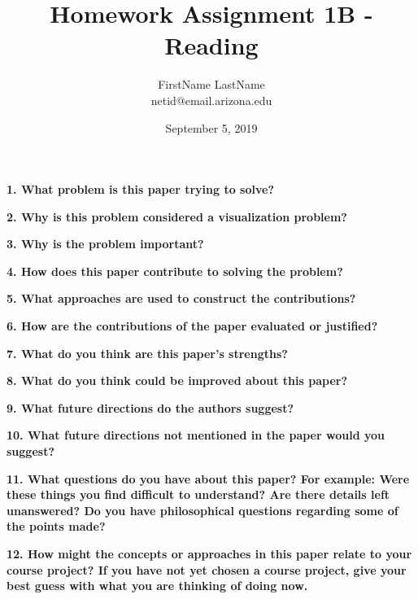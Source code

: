 \documentclass{article}[12pt]
\begin{document}
\title{Homework Assignment 1B - Reading}
\date{September 5, 2019}

\author{
   FirstName LastName \\
   netid@email.arizona.edu
}

\maketitle

\noindent
{\bf 1. What problem is this paper trying to solve?}

\vspace{2ex}\noindent
{\bf 2. Why is this problem considered a visualization problem?}

\vspace{2ex}\noindent
{\bf 3. Why is the problem important?}

\vspace{2ex}\noindent
{\bf 4. How does this paper contribute to solving the problem?} 

\vspace{2ex}\noindent
{\bf 5. What approaches are used to construct the contributions?}

\vspace{2ex}\noindent
{\bf 6. How are the contributions of the paper evaluated or justified?} 

\vspace{2ex}\noindent
{\bf 7. What do you think are this paper's strengths?} 

\vspace{2ex}\noindent
{\bf 8. What do you think could be improved about this paper?}

\vspace{2ex}\noindent
{\bf 9. What future directions do the authors suggest?}

\vspace{2ex}\noindent
{\bf 10. What future directions not mentioned in the paper would you suggest?}

\vspace{2ex}\noindent
{\bf 11. What questions do you have about this paper? For example: Were these things
   you find difficult to understand? Are there details left unanswered? Do you
have philosophical questions regarding some of the points made?}

\vspace{2ex}\noindent
{\bf 12. How might the concepts or approaches in this paper relate to your course
   project? If you have not yet chosen a course project, give your best guess
with what you are thinking of doing now.}
\end{document}
